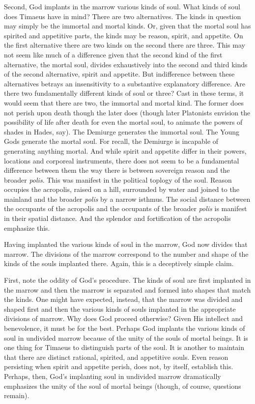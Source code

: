 Second, God implants in the marrow various kinds of soul. What kinds of soul does Timaeus have in mind? There are two alternatives. The kinds in question may simply be the immortal and mortal kinds. Or, given that the mortal soul has spirited and appetitive parts, the kinds may be reason, spirit, and appetite. On the first alternative there are two kinds on the second there are three. This may not seem like much of a difference given that the second kind of the first alternative, the mortal soul, divides exhaustively into the second and third kinds of the second alternative, spirit and appetite. But indifference between these alternatives betrays an insensitivity to a substantive explanatory difference. Are there two fundamentally different kinds of soul or three? Cast in these terms, it would seem that there are two, the immortal and mortal kind. The former does not perish upon death though the later does (though later Platonists envision the possibility of life after death for even the mortal soul, to animate the powers of shades in Hades, say). The Demiurge generates the immortal soul. The Young Gods generate the mortal soul. For recall, the Demiurge is incapable of generating anything mortal. And while spirit and appetite differ in their powers, locations and corporeal instruments, there does not seem to be a fundamental difference between them the way there is between sovereign reason and the broader \emph{polis}. This was manifest in the political toplogy of the soul. Reason occupies the acropolis, raised on a hill, surrounded by water and joined to the mainland and the broader \emph{polis} by a narrow isthmus. The social distance between the occupants of the acropolis and the occupants of the broader \emph{polis} is manifest in their spatial distance. And the splendor and fortification of the acropolis emphasize this. 

Having implanted the various kinds of soul in the marrow, God now divides that marrow. The divisions of the marrow correspond to the number and shape of the kinds of the souls implanted there. Again, this is a deceptively simple claim.

First, note the oddity of God's procedure. The kinds of soul are first implanted in the marrow and then the marrow is separated and formed into shapes that match the kinds. One might have expected, instead, that the marrow was divided and shaped first and then the various kinds of souls implanted in the appropriate divisions of marrow. Why does God proceed otherwise? Given His intellect and benevolence, it must be for the best. Perhaps God implants the various kinds of soul in undivided marrow because of the unity of the souls of mortal beings. It is one thing for Timaeus to distinguish parts of the soul. It is another to maintain that there are distinct rational, spirited, and appetitive souls. Even reason persisting when spirit and appetite perish, does not, by itself, establish this. Perhaps, then, God's implanting soul in undivided marrow dramatically emphasizes the unity of the soul of mortal beings (though, of course, questions remain).

